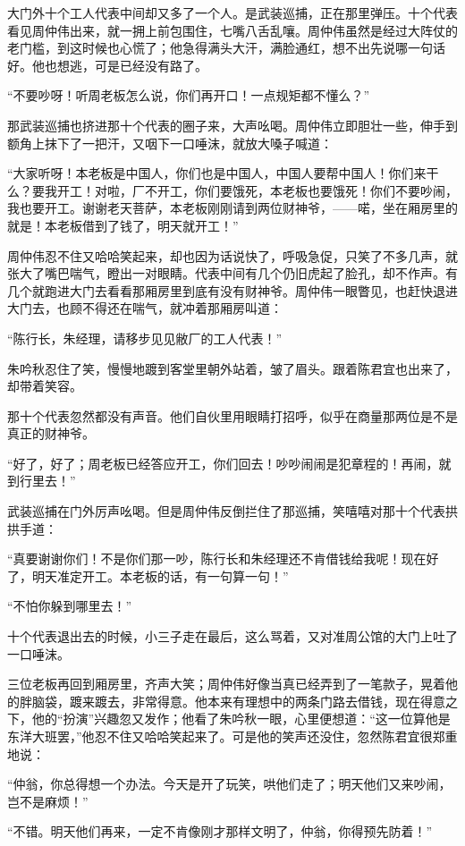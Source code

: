 \par 大门外十个工人代表中间却又多了一个人。是武装巡捕，正在那里弹压。十个代表看见周仲伟出来，就一拥上前包围住，七嘴八舌乱嚷。周仲伟虽然是经过大阵仗的老门槛，到这时候也心慌了；他急得满头大汗，满脸通红，想不出先说哪一句话好。他也想逃，可是已经没有路了。
\par “不要吵呀！听周老板怎么说，你们再开口！一点规矩都不懂么？”
\par 那武装巡捕也挤进那十个代表的圈子来，大声吆喝。周仲伟立即胆壮一些，伸手到额角上抹下了一把汗，又咽下一口唾沫，就放大嗓子喊道：
\par “大家听呀！本老板是中国人，你们也是中国人，中国人要帮中国人！你们来干么？要我开工！对啦，厂不开工，你们要饿死，本老板也要饿死！你们不要吵闹，我也要开工。谢谢老天菩萨，本老板刚刚请到两位财神爷，——喏，坐在厢房里的就是！本老板借到了钱了，明天就开工！”
\par 周仲伟忍不住又哈哈笑起来，却也因为话说快了，呼吸急促，只笑了不多几声，就张大了嘴巴喘气，瞪出一对眼睛。代表中间有几个仍旧虎起了脸孔，却不作声。有几个就跑进大门去看看那厢房里到底有没有财神爷。周仲伟一眼瞥见，也赶快退进大门去，也顾不得还在喘气，就冲着那厢房叫道：
\par “陈行长，朱经理，请移步见见敝厂的工人代表！”
\par 朱吟秋忍住了笑，慢慢地踱到客堂里朝外站着，皱了眉头。跟着陈君宜也出来了，却带着笑容。
\par 那十个代表忽然都没有声音。他们自伙里用眼睛打招呼，似乎在商量那两位是不是真正的财神爷。
\par “好了，好了；周老板已经答应开工，你们回去！吵吵闹闹是犯章程的！再闹，就到行里去！”
\par 武装巡捕在门外厉声吆喝。但是周仲伟反倒拦住了那巡捕，笑嘻嘻对那十个代表拱拱手道：
\par “真要谢谢你们！不是你们那一吵，陈行长和朱经理还不肯借钱给我呢！现在好了，明天准定开工。本老板的话，有一句算一句！”
\par “不怕你躲到哪里去！”
\par 十个代表退出去的时候，小三子走在最后，这么骂着，又对准周公馆的大门上吐了一口唾沫。
\par 三位老板再回到厢房里，齐声大笑；周仲伟好像当真已经弄到了一笔款子，晃着他的胖脑袋，踱来踱去，非常得意。他本来有理想中的两条门路去借钱，现在得意之下，他的“扮演”兴趣忽又发作；他看了朱吟秋一眼，心里便想道：“这一位算他是东洋大班罢，”他忍不住又哈哈笑起来了。可是他的笑声还没住，忽然陈君宜很郑重地说：
\par “仲翁，你总得想一个办法。今天是开了玩笑，哄他们走了；明天他们又来吵闹，岂不是麻烦！”
\par “不错。明天他们再来，一定不肯像刚才那样文明了，仲翁，你得预先防着！”
